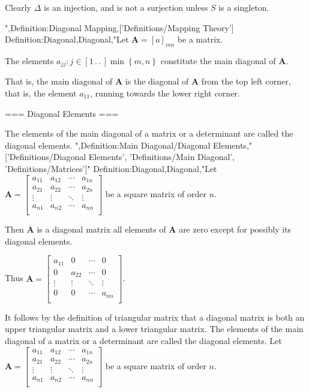 Clearly $\Delta$ is an injection, and is not a surjection unless $S$ is a singleton.

",Definition:Diagonal Mapping,['Definitions/Mapping Theory']
Definition:Diagonal,Diagonal,"Let $\mathbf A = \left[ a \right]_{m n}$ be a matrix.

The elements $a_{j j}: j \in \left[ 1 \,.\,.\,   \right]{\min \left\lbrace m, n \right\rbrace }$ constitute the main diagonal of $\mathbf A$.

That is, the main diagonal of $\mathbf A$ is the diagonal of $\mathbf A$ from the top left corner, that is, the element $a_{1 1}$, running towards the lower right corner.


=== Diagonal Elements ===

The elements of the main diagonal of a matrix or a determinant are called the diagonal elements.
",Definition:Main Diagonal/Diagonal Elements,"['Definitions/Diagonal Elements', 'Definitions/Main Diagonal', 'Definitions/Matrices']"
Definition:Diagonal,Diagonal,"Let $\mathbf A = \begin{bmatrix}
a_{11} & a_{12} & \cdots & a_{1n} \\
a_{21} & a_{22} & \cdots & a_{2n} \\
\vdots & \vdots & \ddots & \vdots \\
a_{n1} & a_{n2} & \cdots & a_{nn} \\
\end{bmatrix}$ be a square matrix of order $n$.

Then $\mathbf A$ is a diagonal matrix  all elements of $\mathbf A$ are zero except for possibly its diagonal elements.


Thus $\mathbf A = \begin{bmatrix}
a_{11} & 0 & \cdots & 0 \\
0 & a_{22} & \cdots & 0 \\
\vdots & \vdots & \ddots & \vdots \\
0 & 0 & \cdots & a_{nn} \\
\end{bmatrix}$.


It follows by the definition of triangular matrix that a diagonal matrix is both an upper triangular matrix and a lower triangular matrix.
The elements of the main diagonal of a matrix or a determinant are called the diagonal elements.
Let $\mathbf A = \begin{bmatrix}
a_{11} & a_{12} & \cdots & a_{1n} \\
a_{21} & a_{22} & \cdots & a_{2n} \\
\vdots & \vdots & \ddots & \vdots \\
a_{n1} & a_{n2} & \cdots & a_{nn} \\
\end{bmatrix}$ be a square matrix of order $n$.

